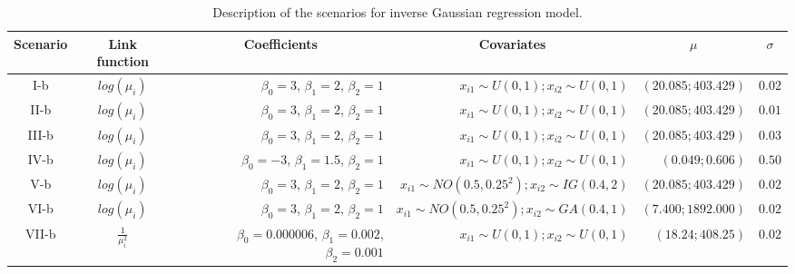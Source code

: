\documentclass[11pt,authoryear,review,3p,times]{elsarticle}
\begin{document}
\begin{table}[htbp]
	\vspace{-1.5em}
	\scriptsize
	\centering
	\caption{Description of the scenarios for inverse Gaussian regression model.}
	\begin{tabular}{ccrrrr}
		\hline
		Scenario & \multicolumn{1}{c}{Link function} & \multicolumn{1}{c}{Coefficients} & \multicolumn{1}{c}{Covariates} &  \multicolumn{1}{c}{$\mu$} & \multicolumn{1}{c}{$\sigma$} \\
		\hline
		I-b   & $log(\mu_i)$& $\beta_0 = 3$, $\beta_1 = 2$, $\beta_2 = 1$ &  $x_{i1}\sim U(0,1); x_{i2}\sim U(0,1)$& $(20{.}085 ; 403{.}429)$ & $0{.}02$ \\
		II-b  & $log(\mu_i)$&$\beta_0 = 3$, $\beta_1 = 2$, $\beta_2 = 1$ &  $x_{i1}\sim U(0,1); x_{i2}\sim U(0,1)$&$(20{.}085 ; 403{.}429)$ & $0{.}01$ \\
		III-b & $log(\mu_i)$& $\beta_0 = 3$, $\beta_1 = 2$, $\beta_2 = 1$ &  $x_{i1}\sim U(0,1); x_{i2}\sim U(0,1)$& $(20{.}085 ; 403{.}429)$ & $0{.}03$ \\
		IV-b  & $log(\mu_i)$& $\beta_0 = -3$, $\beta_1 = 1{.}5$, $\beta_2 = 1$ &  $x_{i1}\sim U(0,1); x_{i2}\sim U(0,1)$& $(0{.}049; 0{.}606)$ & $0{.}50$ \\
		V-b   & $log(\mu_i)$& $\beta_0 = 3$, $\beta_1 = 2$, $\beta_2 = 1$ &  $x_{i1}\sim NO(0.5,0.25^2); x_{i2}\sim IG(0.4,2)$& $(20{.}085 ; 403{.}429)$ & $0{.}02$ \\
		VI-b  &  $log(\mu_i)$&$\beta_0 = 3$, $\beta_1 = 2$, $\beta_2 = 1$ &   $x_{i1}\sim NO(0.5,0.25^2); x_{i2}\sim GA(0.4,1)$& $(7{.}400 ; 1892{.}000)$ & $0{.}02$ \\
		VII-b & $\frac{1}{\mu_i^2}$& $\beta_{0}=0{.}000006$, $\beta_1=0{.}002$, $\beta_2=0.001$ &  $x_{i1}\sim U(0,1); x_{i2}\sim U(0,1)$& $(18{.}24 ; 408{.}25)$ & $0{.}02$ \\
		\hline
	\end{tabular}%
	\label{tab:2}%
\end{table}%
\end{document}
